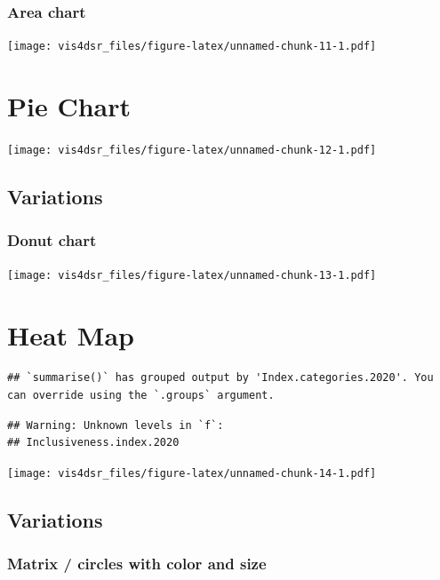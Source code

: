 \documentclass[
]{krantz}
\begin{document}
\hypertarget{area-chart}{%
\subsubsection{Area chart}\label{area-chart}}

\texttt{[image: vis4dsr\_files/figure-latex/unnamed-chunk-11-1.pdf]}

\hypertarget{pie-chart}{%
\section{Pie Chart}\label{pie-chart}}

\texttt{[image: vis4dsr\_files/figure-latex/unnamed-chunk-12-1.pdf]}

\hypertarget{variations-3}{%
\subsection{Variations}\label{variations-3}}

\hypertarget{donut-chart}{%
\subsubsection{Donut chart}\label{donut-chart}}

\texttt{[image: vis4dsr\_files/figure-latex/unnamed-chunk-13-1.pdf]}

\hypertarget{heat-map}{%
\section{Heat Map}\label{heat-map}}

\begin{verbatim}
## `summarise()` has grouped output by 'Index.categories.2020'. You can override using the `.groups` argument.
\end{verbatim}

\begin{verbatim}
## Warning: Unknown levels in `f`:
## Inclusiveness.index.2020
\end{verbatim}

\texttt{[image: vis4dsr\_files/figure-latex/unnamed-chunk-14-1.pdf]}

\hypertarget{variations-4}{%
\subsection{Variations}\label{variations-4}}

\hypertarget{matrix-circles-with-color-and-size}{%
\subsubsection{Matrix / circles with color and size}\label{matrix-circles-with-color-and-size}}
\end{document}
